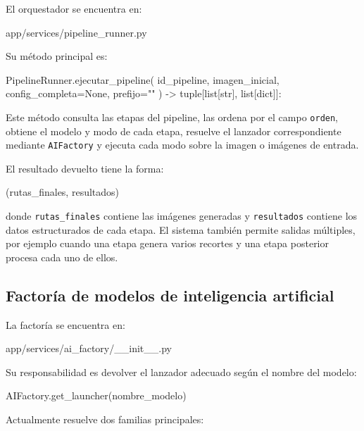 El orquestador se encuentra en:

\begin{bloqueCodigo}[title={Orquestador de pipelines}]
	app/services/pipeline_runner.py
\end{bloqueCodigo}

Su método principal es:

\begin{bloqueCodigo}[title={Método principal del orquestador}]
	PipelineRunner.ejecutar_pipeline(
			id_pipeline,
			imagen_inicial,
			config_completa=None,
			prefijo=""
	) -> tuple[list[str], list[dict]]:
	
\end{bloqueCodigo}

Este método consulta las etapas del pipeline, las ordena por el campo \texttt{orden}, obtiene el modelo y modo de cada etapa, resuelve el lanzador correspondiente mediante \texttt{AIFactory} y ejecuta cada modo sobre la imagen o imágenes de entrada.

El resultado devuelto tiene la forma:

\begin{bloqueCodigo}[title={Salida del orquestador}]
	(rutas_finales, resultados)
\end{bloqueCodigo}

donde \texttt{rutas\_finales} contiene las imágenes generadas y \texttt{resultados} contiene los datos estructurados de cada etapa. El sistema también permite salidas múltiples, por ejemplo cuando una etapa genera varios recortes y una etapa posterior procesa cada uno de ellos.

\subsection{Factoría de modelos de inteligencia artificial}

La factoría se encuentra en:

\begin{bloqueCodigo}[title={Factoría de modelos de IA}]
	app/services/ai_factory/__init__.py
\end{bloqueCodigo}

Su responsabilidad es devolver el lanzador adecuado según el nombre del modelo:

\begin{bloqueCodigo}[title={Resolución de lanzador}]
	AIFactory.get_launcher(nombre_modelo)
\end{bloqueCodigo}

Actualmente resuelve dos familias principales:

